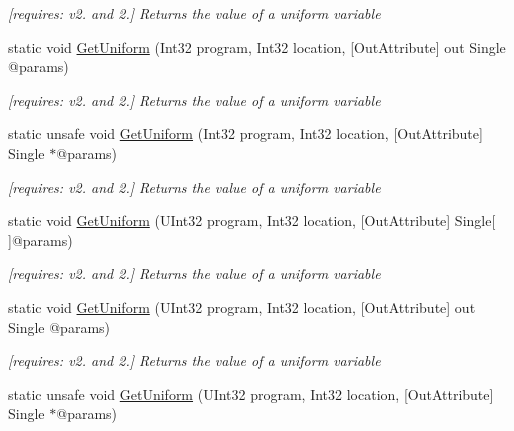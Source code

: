 \begin{DoxyCompactItemize}
\begin{DoxyCompactList}\small\item\em \mbox{[}requires\-: v2. and 2.\mbox{]} Returns the value of a uniform variable \end{DoxyCompactList}\item 
static void \hyperlink{class_open_t_k_1_1_graphics_1_1_e_s20_1_1_g_l_a89eb902289448b955b985faaec688ee9}{Get\-Uniform} (Int32 program, Int32 location, \mbox{[}Out\-Attribute\mbox{]} out Single @params)
\begin{DoxyCompactList}\small\item\em \mbox{[}requires\-: v2. and 2.\mbox{]} Returns the value of a uniform variable \end{DoxyCompactList}\item 
static unsafe void \hyperlink{class_open_t_k_1_1_graphics_1_1_e_s20_1_1_g_l_a2e4c5ef9275d0122b7ad04f2c7772dfb}{Get\-Uniform} (Int32 program, Int32 location, \mbox{[}Out\-Attribute\mbox{]} Single $\ast$@params)
\begin{DoxyCompactList}\small\item\em \mbox{[}requires\-: v2. and 2.\mbox{]} Returns the value of a uniform variable \end{DoxyCompactList}\item 
static void \hyperlink{class_open_t_k_1_1_graphics_1_1_e_s20_1_1_g_l_aafa8f15d9f27afc88015c5a08ed0e595}{Get\-Uniform} (U\-Int32 program, Int32 location, \mbox{[}Out\-Attribute\mbox{]} Single\mbox{[}$\,$\mbox{]}@params)
\begin{DoxyCompactList}\small\item\em \mbox{[}requires\-: v2. and 2.\mbox{]} Returns the value of a uniform variable \end{DoxyCompactList}\item 
static void \hyperlink{class_open_t_k_1_1_graphics_1_1_e_s20_1_1_g_l_a021cce93df4c3652b11846003276ffe2}{Get\-Uniform} (U\-Int32 program, Int32 location, \mbox{[}Out\-Attribute\mbox{]} out Single @params)
\begin{DoxyCompactList}\small\item\em \mbox{[}requires\-: v2. and 2.\mbox{]} Returns the value of a uniform variable \end{DoxyCompactList}\item 
static unsafe void \hyperlink{class_open_t_k_1_1_graphics_1_1_e_s20_1_1_g_l_a4dcbcf7a50aff871739a44c03fa0325d}{Get\-Uniform} (U\-Int32 program, Int32 location, \mbox{[}Out\-Attribute\mbox{]} Single $\ast$@params)

\end{DoxyCompactItemize}
